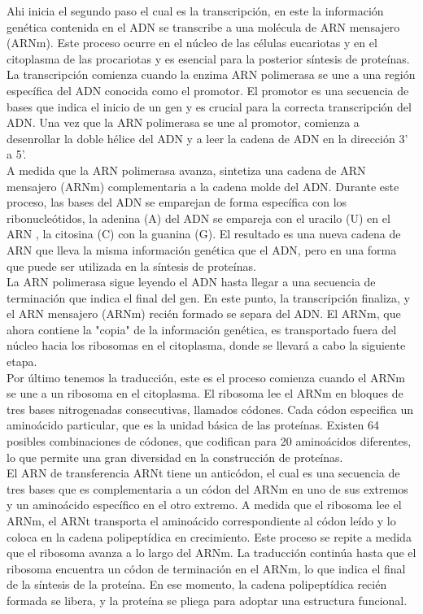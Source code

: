 \documentclass[12pt]{article}
\begin{document}
Ahi inicia el segundo paso el cual es la transcripción, en este la información genética contenida en el ADN se transcribe a una molécula de ARN mensajero (ARNm). Este proceso ocurre en el núcleo de las células eucariotas y en el citoplasma de las procariotas y es esencial para la posterior síntesis de proteínas. La transcripción comienza cuando la enzima ARN polimerasa se une a una región específica del ADN conocida como el promotor. El promotor es una secuencia de bases que indica el inicio de un gen y es crucial para la correcta transcripción del ADN. Una vez que la ARN polimerasa se une al promotor, comienza a desenrollar la doble hélice del ADN y a leer la cadena de ADN en la dirección 3' a 5'.\\

A medida que la ARN polimerasa avanza, sintetiza una cadena de ARN mensajero (ARNm) complementaria a la cadena molde del ADN. Durante este proceso, las bases del ADN se emparejan de forma específica con los ribonucleótidos, la adenina (A) del ADN se empareja con el uracilo (U) en el ARN , la citosina (C) con la guanina (G). El resultado es una nueva cadena de ARN que lleva la misma información genética que el ADN, pero en una forma que puede ser utilizada en la síntesis de proteínas.\\

La ARN polimerasa sigue leyendo el ADN hasta llegar a una secuencia de terminación que indica el final del gen. En este punto, la transcripción finaliza, y el ARN mensajero (ARNm) recién formado se separa del ADN. El ARNm, que ahora contiene la "copia" de la información genética, es transportado fuera del núcleo hacia los ribosomas en el citoplasma, donde se llevará a cabo la siguiente etapa.\\

Por último tenemos la traducción, este es el proceso  comienza cuando el ARNm se une a un ribosoma en el citoplasma. El ribosoma lee el ARNm en bloques de tres bases nitrogenadas consecutivas, llamados códones. Cada códon especifica un aminoácido particular, que es la unidad básica de las proteínas. Existen 64 posibles combinaciones de códones, que codifican para 20 aminoácidos diferentes, lo que permite una gran diversidad en la construcción de proteínas.\\

El ARN de transferencia ARNt  tiene un anticódon, el cual es una secuencia de tres bases que es complementaria a un códon del ARNm en uno de sus extremos y un aminoácido específico en el otro extremo. A medida que el ribosoma lee el ARNm, el ARNt transporta el aminoácido correspondiente al códon leído y lo coloca en la cadena polipeptídica en crecimiento. Este proceso se repite a medida que el ribosoma avanza a lo largo del ARNm. La traducción continúa hasta que el ribosoma encuentra un códon de terminación en el ARNm, lo que indica el final de la síntesis de la proteína. En ese momento, la cadena polipeptídica recién formada se libera, y la proteína se pliega para adoptar una estructura funcional.\\
\end{document}
